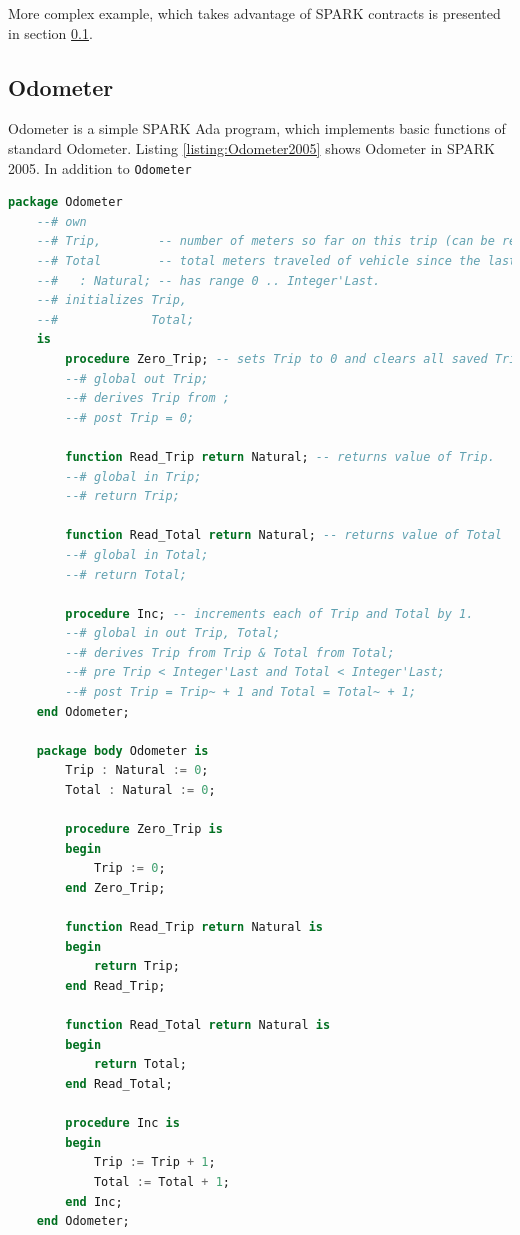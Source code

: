 More complex example, which takes advantage of SPARK contracts is presented in section \ref{pcapumpimpl:beagleboard:odometer}.

\subsection{Odometer}
\label{pcapumpimpl:beagleboard:odometer}

Odometer is a simple SPARK Ada program, which implements basic functions of standard Odometer. Listing \ref{listing:Odometer2005} shows Odometer in SPARK 2005. In addition to \lstinline{Odometer}

\singlespacing
\begin{lstlisting}[language=ada, frame=single, gobble=0, caption={SPARK 2005 code: Odometer}]
	package Odometer
	--# own
	--# Trip,        -- number of meters so far on this trip (can be reset to 0).
	--# Total        -- total meters traveled of vehicle since the last factory-reset.
	--#   : Natural; -- has range 0 .. Integer'Last.
	--# initializes Trip,
	--#             Total;
	is
	    procedure Zero_Trip; -- sets Trip to 0 and clears all saved Trip marks.
	    --# global out Trip;
	    --# derives Trip from ;
	    --# post Trip = 0;
	    
	    function Read_Trip return Natural; -- returns value of Trip.
	    --# global in Trip;
	    --# return Trip;
	    
	    function Read_Total return Natural; -- returns value of Total
	    --# global in Total;
	    --# return Total;
	    
	    procedure Inc; -- increments each of Trip and Total by 1.
	    --# global in out Trip, Total;
	    --# derives Trip from Trip & Total from Total;
	    --# pre Trip < Integer'Last and Total < Integer'Last;
	    --# post Trip = Trip~ + 1 and Total = Total~ + 1;	    
	end Odometer;

	package body Odometer is
	    Trip : Natural := 0;
	    Total : Natural := 0;
	    
	    procedure Zero_Trip is
	    begin
	        Trip := 0;
	    end Zero_Trip;
	    
	    function Read_Trip return Natural is
	    begin
	        return Trip;
	    end Read_Trip;
	    
	    function Read_Total return Natural is
	    begin
	        return Total;
	    end Read_Total;
	    
	    procedure Inc is
	    begin
	        Trip := Trip + 1;
	        Total := Total + 1;
	    end Inc;
	end Odometer;
\end{lstlisting} 
\label{listing:Odometer2005}
\doublespacing

